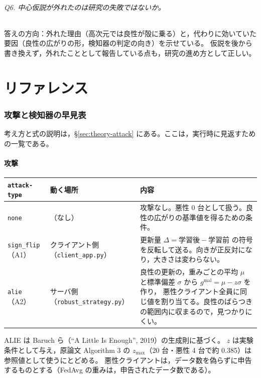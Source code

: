 \documentclass[a4j, dvipdfmx]{jsarticle}  %
\begin{document}
\paragraph{Q6. 中心仮説が外れたのは研究の失敗ではないか。}
答えの方向：外れた理由（高次元では良性が殻に乗る）と，代わりに効いていた要因（良性の広がりの形，検知器の判定の向き）を示せている。
仮説を後から書き換えず，外れたこととして報告している点も，研究の進め方として正しい。

\part{リファレンス}
\label{part:reference}

\section{攻撃と検知器の早見表}
\label{sec:attack}

考え方と式の説明は，\S\ref{sec:theory-attack} にある。ここは，実行時に見返すための一覧である。

\subsection{攻撃}

\begin{table}[H]
\centering
\begin{tabular}{@{}P{2.6cm} P{4.0cm} P{8.7cm}@{}}
\toprule
\texttt{attack-type} & 動く場所 & 内容 \\
\midrule
\texttt{none} & （なし） & 攻撃なし。悪性 0 台として扱う。良性の広がりの基準値を得るための条件。 \\
\texttt{sign\_flip}（A1） & クライアント側（\texttt{client\_app.py}） &
更新量 $\Delta = \text{学習後} - \text{学習前}$ の符号を反転して送る。向きが正反対になり，大きさは変わらない。 \\
\texttt{alie}（A2） & サーバ側（\texttt{robust\_strategy.py}） &
良性の更新の，重みごとの平均 $\mu$ と標準偏差 $\sigma$ から $g^{\text{mal}} = \mu - z\sigma$ を作り，
悪性クライアント全員に同じ値を割り当てる。良性のばらつきの範囲内に収まるので，見つかりにくい。 \\
\bottomrule
\end{tabular}
\end{table}

ALIE は Baruch ら（``A Little Is Enough'', 2019）の生成則に基づく。
$z$ は実験条件として与え，原論文 Algorithm 3 の $z_{\max}$（20 台・悪性 4 台で約 0.385）は参照値として使うにとどめる。
悪性クライアントは，データ数を偽らずに申告するものとする（FedAvg の重みは，申告されたデータ数である）。
\end{document}
